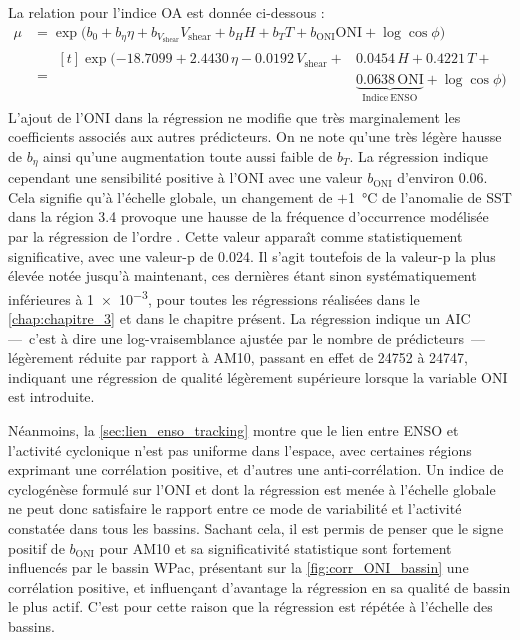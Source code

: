 \documentclass[../main.tex]{subfiles}
\begin{document}
La relation pour l'indice OA est donnée ci-dessous :
%
\begin{align*}
    \tag{OA}
    \mu &= \exp \big( b_0 + b_\eta \eta + b_{V_{\mathrm{shear}}} V_{\mathrm{shear}} + b_H H + b_T T + b_{\mathrm{ONI}} \mathrm{ONI} + \log \cos \phi \big)\\
        &= \begin{aligned}[t]\exp \big( \num{-18.7099} + \num{2.4430}\, \eta - \num{0.0192}\, V_{\mathrm{shear}} + &\num{0.0454}\, H + \num{0.4221}\, T + \\&\underbrace{\num{0.0638}\, \mathrm{ONI}}_{\mathrm{Indice\ ENSO}} + \log \cos \phi \big)\end{aligned} \end{align*}
%
L'ajout de l'ONI dans la régression ne modifie que très marginalement les coefficients associés aux autres prédicteurs. On ne note qu'une très légère hausse de
$b_\eta$ ainsi qu'une augmentation toute aussi faible de $b_T$. La régression indique cependant une sensibilité positive à l'ONI avec une valeur
$b_{\mathrm{ONI}}$ d'environ \num{0.06}. Cela signifie qu'à l'échelle globale, un changement de $+$\SI{1}{\degreeCelsius} de l'anomalie de SST dans la région
3.4 provoque une hausse de la fréquence d'occurrence modélisée par la régression de l'ordre . Cette valeur apparaît comme statistiquement significative,
avec une valeur-p de \num{0.024}. Il s'agit toutefois de la valeur-p la plus élevée notée jusqu'à maintenant, ces dernières étant sinon systématiquement
inférieures à \num{1e-3}, pour toutes les régressions réalisées dans le \cref{chap:chapitre_3} et dans le chapitre présent. La régression indique un AIC
\parencite[\textit{Akaike Information Criterion},][]{akaike_information_1998} ---~c'est à dire une log-vraisemblance ajustée par le nombre de prédicteurs~---
légèrement réduite par rapport à AM10, passant en effet de \num{24752} à \num{24747}, indiquant une régression de qualité légèrement supérieure lorsque la
variable ONI est introduite.

Néanmoins, la \cref{sec:lien_enso_tracking} montre que le lien entre ENSO et l'activité cyclonique n'est pas uniforme dans l'espace, avec certaines régions
exprimant une corrélation positive, et d'autres une anti-corrélation. Un indice de cyclogénèse formulé sur l'ONI et dont la régression est menée à l'échelle
globale ne peut donc satisfaire le rapport entre ce mode de variabilité et l'activité constatée dans tous les bassins. Sachant cela, il est permis de penser que
le signe positif de $b_{\mathrm{ONI}}$ pour AM10 et sa significativité statistique sont fortement influencés par le bassin WPac, présentant sur la
\cref{fig:corr_ONI_bassin} une corrélation positive, et influençant d'avantage la régression en sa qualité de bassin le plus actif. C'est pour cette raison que la
régression est répétée à l'échelle des bassins.
\end{document}
